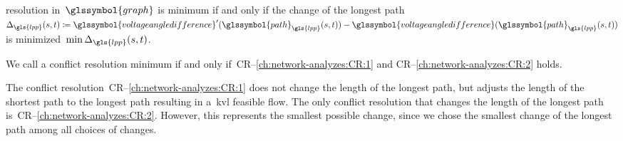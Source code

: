 \begin{definition}
\begin{compactenum}[\hspace*{1cm}(CR--1)]
    resolution in~$\glssymbol{graph}$ is minimum if and only if the change of
    the longest path~$
    \Delta_{\gls{lpp}}(\source,\sink)
    \coloneqq
    \glssymbol{voltageangledifference}'(\glssymbol{path}_{\gls{lpp}}(\source,\sink))
    -
    \glssymbol{voltageangledifference}(\glssymbol{path}_{\gls{lpp}}(\source,\sink))
    $
    is minimized~$
    \min\Delta_{\gls{lpp}}(\source,\sink)
    $.
    \label{ch:network-analyzes:CR:2}
    \end{compactenum}
    We call a conflict resolution minimum if and only
    if~\mbox{CR--\ref{ch:network-analyzes:CR:1}} and
    \mbox{CR--\ref{ch:network-analyzes:CR:2}} holds.
    \label{ch:network-analyzes:CR}
\end{definition}
% 
    The conflict resolution~CR--\ref{ch:network-analyzes:CR:1} does not change
    the length of the longest path, but adjusts the length of the shortest path
    to the longest path resulting in a~\gls{kvl} feasible flow. The only
    conflict resolution that changes the length of the longest path
    is~CR--\ref{ch:network-analyzes:CR:2}. However, this represents the smallest
    possible change, since we chose the smallest change of the longest path
    among all choices of changes.%

